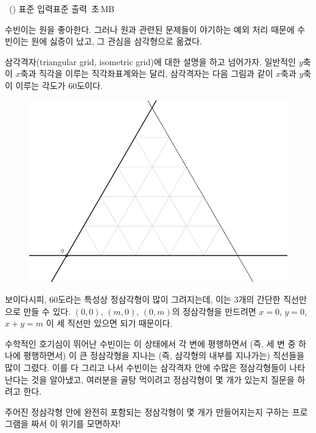 \begin{problem}{\kcpcpprobtriangle\ (\kcpcpprobtriangleshort)}
    {표준 입력}{표준 출력}
    {\kcpcpprobtriangletime\,초}{\kcpcpprobtrianglememory\,MB}{}
    
    수빈이는 원을 좋아한다. 그러나 원과 관련된 문제들이 야기하는 예외 처리 때문에 수빈이는 원에 싫증이 났고, 그 관심을 삼각형으로 옮겼다.
    
    삼각격자(triangular grid, isometric grid)에 대한 설명을 하고 넘어가자. 일반적인 $ y $축이 $ x $축과 직각을 이루는 직각좌표계와는 달리, 삼각격자는 다음 그림과 같이 $ x $축과 $ y $축이 이루는 각도가 60도이다.
    
    \begin{figure}[h]
        \centering
        \includegraphics[height=0.25\textheight]{./problems/triangle-pic1.png}
    \end{figure}

    보이다시피, 60도라는 특성상 정삼각형이 많이 그려지는데, 이는 3개의 간단한 직선만으로 만들 수 있다. $ (0,0) $, $ (m,0) $, $ (0,m) $의 정삼각형을 만드려면 $ x=0 $, $ y=0 $, $ x+y=m $ 이 세 직선만 있으면 되기 때문이다.
    
    수학적인 호기심이 뛰어난 수빈이는 이 상태에서 각 변에 평행하면서 (즉, 세 변 중 하나에 평행하면서) 이 큰 정삼각형을 지나는 (즉, 삼각형의 내부를 지나가는) 직선들을 많이 그렸다. 이를 다 그리고 나서 수빈이는 삼각격자 안에 수많은 정삼각형들이 나타난다는 것을 알아냈고, 여러분을 골탕 먹이려고 정삼각형이 몇 개가 있는지 질문을 하려고 한다.
    
    주어진 정삼각형 안에 완전히 포함되는 정삼각형이 몇 개가 만들어지는지 구하는 프로그램을 짜서 이 위기를 모면하자!
    

\end{problem}
